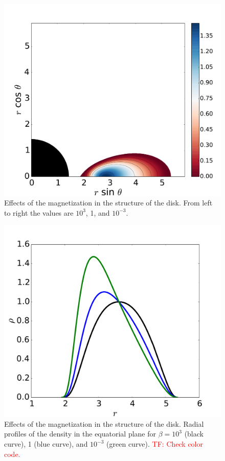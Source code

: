 \documentclass{aa}
\newcommand{\tf}[1]{\textcolor{red}{TF: #1}}
\begin{document}
\begin{figure}
\includegraphics[scale=0.16]{figures/fig3c.pdf}
\caption{Effects of the magnetization in the structure of the disk. From left to right the values are $10^3$, 1, and $10^{-3}$.}
           \label{magnetization}%
 \end{figure}
 
\begin{figure}[h!]
\centering
\includegraphics[scale=0.25]{figures/fig4.pdf}
\caption{Effects of the magnetization in the structure of the disk. Radial profiles of the density in the equatorial plane for $\beta=10^3$ (black curve), 1 (blue curve), and $10^{-3}$ (green curve). \tf{Check color code.}}
           \label{magnetization-profile}%
 \end{figure}
 
\end{document}
